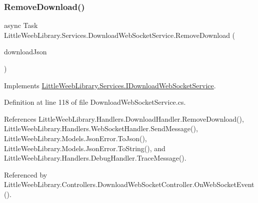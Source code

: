 \mbox{\label{class_little_weeb_library_1_1_services_1_1_download_web_socket_service_a3bc6b4176561f56b918e75527c7698d0}} 
\subsubsection{\texorpdfstring{Remove\+Download()}{RemoveDownload()}}
{\footnotesize\ttfamily async Task Little\+Weeb\+Library.\+Services.\+Download\+Web\+Socket\+Service.\+Remove\+Download (\begin{DoxyParamCaption}\item[{J\+Object}]{download\+Json }\end{DoxyParamCaption})}



Implements \mbox{\hyperlink{interface_little_weeb_library_1_1_services_1_1_i_download_web_socket_service_a746432ed84ef331ea5851e645da54941}{Little\+Weeb\+Library.\+Services.\+I\+Download\+Web\+Socket\+Service}}.



Definition at line 118 of file Download\+Web\+Socket\+Service.\+cs.



References Little\+Weeb\+Library.\+Handlers.\+Download\+Handler.\+Remove\+Download(), Little\+Weeb\+Library.\+Handlers.\+Web\+Socket\+Handler.\+Send\+Message(), Little\+Weeb\+Library.\+Models.\+Json\+Error.\+To\+Json(), Little\+Weeb\+Library.\+Models.\+Json\+Error.\+To\+String(), and Little\+Weeb\+Library.\+Handlers.\+Debug\+Handler.\+Trace\+Message().



Referenced by Little\+Weeb\+Library.\+Controllers.\+Download\+Web\+Socket\+Controller.\+On\+Web\+Socket\+Event().


